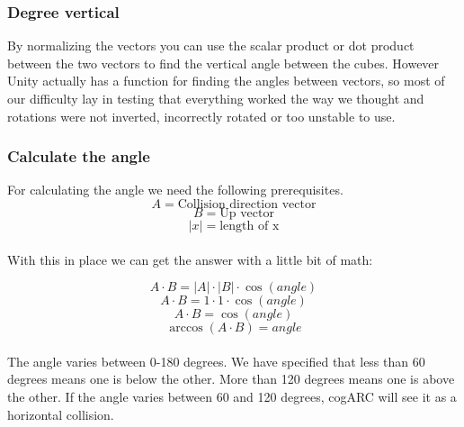 \subsubsection{Degree vertical}
By normalizing the vectors you can use the scalar product or dot product between the two vectors to find the vertical angle between the cubes. However Unity actually has a function for finding the angles between vectors, so most of our difficulty lay in testing that everything worked the way we thought and rotations were not inverted, incorrectly rotated or too unstable to use.


\subsubsection{Calculate the angle}
\newcommand{\norm}[1]{\lvert #1 \rvert}

For calculating the angle we need the following prerequisites.
\[
A = \text{Collision direction vector}
\]
\[
B = \text{Up vector}
\]
\[
\norm{x} = \text{length of x}
\]

\paragraph{}
With this in place we can get the answer with a little bit of math:

\[
A \cdot B = \norm{A} \cdot \norm{B} \cdot \cos(angle)
\]
\[
A \cdot B = 1 \cdot 1 \cdot \cos(angle)
\]
\[
A \cdot B = \cos(angle)
\]
\[
\arccos(A \cdot B) = angle
\]


\paragraph{}
 The angle varies between 0-180 degrees. We have specified that less than 60 degrees means one is below the other. More than 120 degrees means one is above the other. If the angle varies between 60 and 120 degrees, cogARC will see it as a horizontal collision.
